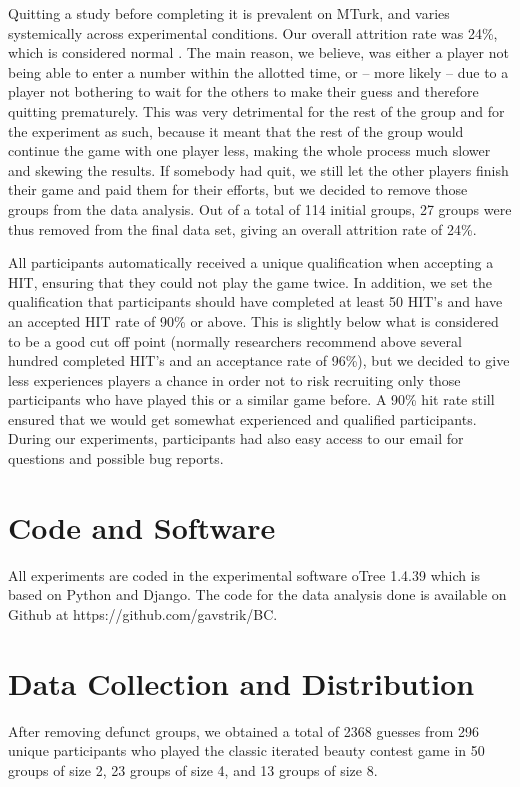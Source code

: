 Quitting a study before completing it is prevalent on MTurk, and varies systemically across experimental conditions. Our overall attrition rate was 24\%, which is considered normal \citep{ZhouFishbach16}. The main reason, we believe, was either a player not being able to enter a number within the allotted time, or – more likely – due to a player not bothering to wait for the others to make their guess and therefore quitting prematurely. This was very detrimental for the rest of the group and for the experiment as such, because it meant that the rest of the group would continue the game with one player less, making the whole process much slower and skewing the results. If somebody had quit, we still let the other players finish their game and paid them for their efforts, but we decided to remove those groups from the data analysis. Out of a total of 114 initial groups, 27 groups were thus removed from the final data set, giving an overall attrition rate of 24\%.

All participants automatically received a unique qualification when accepting a HIT, ensuring that they could not play the game twice. In addition, we set the qualification that participants should have completed at least 50 HIT's and have an accepted HIT rate of 90\% or above. This is slightly below what is considered to be a good cut off point (normally researchers recommend above several hundred completed HIT's and an acceptance rate of 96\%), but we decided to give less experiences players a chance in order not to risk recruiting only those participants who have played this or a similar game before. A 90\% hit rate still ensured that we would get somewhat experienced and qualified participants. During our experiments, participants had also easy access to our email for questions and possible bug reports. 

\section{Code and Software}
\noindent
All experiments are coded in the experimental software oTree 1.4.39 \citep{ChenSchongerWickens16} which is based on Python and Django. The code for the data analysis done is available on Github at https://github.com/gavstrik/BC.

\section{Data Collection and Distribution}
\noindent
After removing defunct groups, we obtained a total of 2368 guesses from 296 unique participants who played the classic iterated beauty contest game in 50 groups of size 2, 23 groups of size 4, and 13 groups of size 8.

